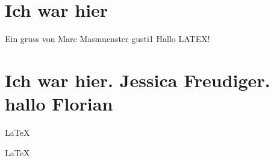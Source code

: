 \documentclass{article}
\begin{document}
\section{Ich war hier}
Ein gruss von Marc Masmuenster gusti1
Hallo LATEX!  
\section{Ich war hier. Jessica Freudiger. hallo Florian}

\LaTeX 

\huge
\LaTeX 
   
\end{document}
